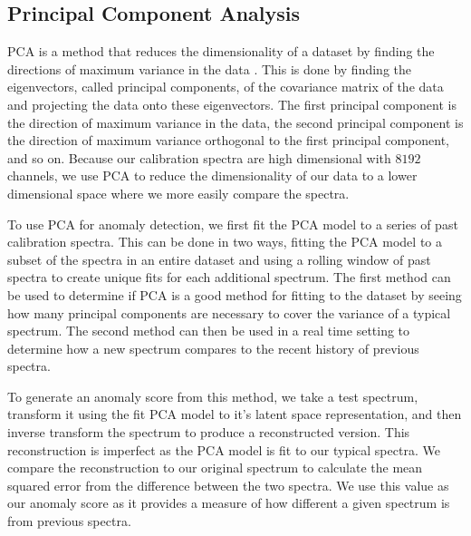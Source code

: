 \subsection{Principal Component Analysis}
PCA is a method that reduces the dimensionality of a dataset by finding the directions of maximum variance in the data \parencite{wold1987principal}.
This is done by finding the eigenvectors, called principal components, of the covariance matrix of the data and projecting the data onto these eigenvectors.
The first principal component is the direction of maximum variance in the data, the second principal component is the direction of maximum variance orthogonal to the first principal component, and so on.
Because our calibration spectra are high dimensional with $8192$ channels, we use PCA to reduce the dimensionality of our data to a lower dimensional space where we more easily compare the spectra.

To use PCA for anomaly detection, we first fit the PCA model to a series of past calibration spectra.
This can be done in two ways, fitting the PCA model to a subset of the spectra in an entire dataset and using a rolling window of past spectra to create unique fits for each additional spectrum. 
The first method can be used to determine if PCA is a good method for fitting to the dataset by seeing how many principal components are necessary to cover the variance of a typical spectrum. 
The second method can then be used in a real time setting to determine how a new spectrum compares to the recent history of previous spectra. 

To generate an anomaly score from this method, we take a test spectrum, transform it using the fit PCA model to it's latent space representation, and then inverse transform the spectrum to produce a reconstructed version. 
This reconstruction is imperfect as the PCA model is fit to our typical spectra.
We compare the reconstruction to our original spectrum to calculate the mean squared error from the difference between the two spectra. 
We use this value as our anomaly score as it provides a measure of how different a given spectrum is from previous spectra. 

